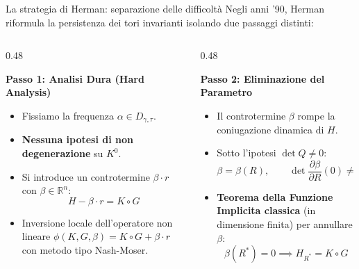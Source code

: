 \documentclass[10pt,aspectratio=169]{beamer}
\newcommand{\R}{\mathbb{R}}
\newcommand{\blu}[1]{\textcolor{UniBlue}{\textbf{#1}}}
\begin{document}
\begin{frame}{La strategia di Herman: separazione delle difficoltà}
  Negli anni '90, Herman riformula la persistenza dei tori invarianti isolando due passaggi distinti:
  \medskip
  \begin{columns}[t]
    \begin{column}{0.48\textwidth}
      \begin{block}{\blu{Passo 1: Analisi Dura (Hard Analysis)}}
        \begin{itemize}
          \item Fissiamo la frequenza $\alpha \in D_{\gamma, \tau}$.
          \item \textbf{Nessuna ipotesi di non degenerazione} su $K^0$.
          \item Si introduce un \alert{controtermine} $\beta \cdot r$ con $\beta \in \R^n$:
          \[
            H - \beta \cdot r = K \circ G
          \]
          \item Inversione locale dell'operatore non lineare $\phi(K, G, \beta) = K \circ G + \beta \cdot r$ con metodo tipo Nash-Moser.
        \end{itemize}
      \end{block}
    \end{column}
    \pause
    \begin{column}{0.48\textwidth}
      \begin{block}{\blu{Passo 2: Eliminazione del Parametro}}
        \begin{itemize}
          \item Il controtermine $\beta$ rompe la coniugazione dinamica di $H$.
          \item Sotto l'ipotesi $\det Q \neq 0$:
          \[
            \beta = \beta(R), \qquad \det \frac{\partial \beta}{\partial R}(0) \neq 0
          \]
          \item \textbf{Teorema della Funzione Implicita classica} (in dimensione finita) per annullare $\beta$:
          \[
            \beta(R^*) = 0 \implies H_{R^*} = K \circ G
          \]
        \end{itemize}
      \end{block}
    \end{column}
  \end{columns}
\end{frame}
\end{document}
